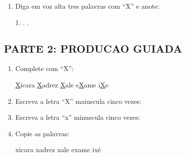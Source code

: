 \begin{exercicio}
\begin{enumerate}
  \item Diga em voz alta tres palavras com ``X'' e anote:
  \begin{center}
  1. \underline{\hspace{4cm}} . \underline{\hspace{4cm}} . \underline{\hspace{4cm}}
  \end{center}
\end{enumerate}

\subsection*{PARTE 2: PRODUCAO GUIADA}

\begin{enumerate}[resume]
  \item Complete com ``X'':
  \begin{center}
  \underline{X}icara \quad \underline{X}adrez \quad \underline{X}ale \quad e\underline{X}ame \quad i\underline{X}e
  \end{center}

  \item Escreva a letra ``X'' maiuscula cinco vezes:
  \begin{center}
  \underline{\hspace{1.5cm}} \quad \underline{\hspace{1.5cm}} \quad \underline{\hspace{1.5cm}} \quad \underline{\hspace{1.5cm}} \quad \underline{\hspace{1.5cm}}
  \end{center}

  \item Escreva a letra ``x'' minuscula cinco vezes:
  \begin{center}
  \underline{\hspace{1.5cm}} \quad \underline{\hspace{1.5cm}} \quad \underline{\hspace{1.5cm}} \quad \underline{\hspace{1.5cm}} \quad \underline{\hspace{1.5cm}}
  \end{center}

  \item Copie as palavras:
  \begin{center}
  xicara \quad xadrez \quad xale \quad exame \quad ixé
  \end{center}


\end{enumerate}
\end{exercicio}
